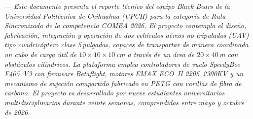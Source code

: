 \documentclass[10pt, twocolumn, letterpaper]{article}
\begin{document}

—{\fontsize{9}{11}\itshape\selectfont
Este documento presenta el reporte técnico del equipo Black Bears de la
Universidad Politécnica de Chihuahua (UPCH) para la categoría de Ruta
Sincronizada de la competencia COMEA 2026. El proyecto contempla el diseño,
fabricación, integración y operación de dos vehículos aéreos no tripulados (UAV)
tipo cuadricóptero clase 5\,pulgadas, capaces de transportar de manera coordinada
un cubo de carga útil de $10\times10\times10$\,cm a través de un área de
$20\times40$\,m con obstáculos cilíndricos. La plataforma emplea controladores de
vuelo SpeedyBee F405~V3 con firmware Betaflight, motores EMAX ECO~II 2205~2300KV
y un mecanismo de sujeción compartido fabricado en PETG con varillas de fibra de
carbono. El proyecto es desarrollado por nueve estudiantes universitarios
multidisciplinarios durante veinte semanas, comprendidas entre mayo y octubre
de 2026.}
\vspace{4pt}
\end{document}

